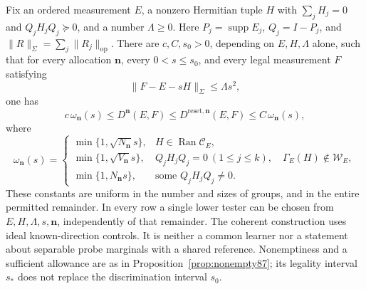 \begin{theorem}\label{thm:allocation89}
Fix an ordered measurement $E$, a nonzero Hermitian tuple $H$ with
$\sum_jH_j=0$ and $Q_jH_jQ_j\succeq0$, and a number $\Lambda\ge0$.
Here $P_j=\operatorname{supp}E_j$, $Q_j=I-P_j$, and
$\|R\|_\Sigma=\sum_j\|R_j\|_{\mathrm{op}}$.
There are $c,C,s_0>0$, depending on $E,H,\Lambda$ alone, such that
for every allocation $\boldsymbol n$, every $0<s\le s_0$, and every
legal measurement $F$ satisfying
\begin{equation}\label{eq:allocationtube89}
 \|F-E-sH\|_\Sigma\le\Lambda s^2,
\end{equation}
one has
\begin{equation}\label{eq:allocationlaw89}
 c\,\omega_{\boldsymbol n}(s)
 \le D^{\boldsymbol n}(E,F)
 \le D^{\mathrm{reset},\boldsymbol n}(E,F)\le C\,\omega_{\boldsymbol n}(s),
\end{equation}
where
\[
 \omega_{\boldsymbol n}(s)=
 \begin{cases}
 \min\{1,\sqrt{N_{\boldsymbol n}}s\},
                    &H\in\operatorname{Ran}\mathcal C_E,\\
 \min\{1,\sqrt{V_{\boldsymbol n}}s\},
                    &Q_jH_jQ_j=0\ (1\le j\le k),\quad
                           \Gamma_E(H)\notin\mathcal W_E,\\
 \min\{1,N_{\boldsymbol n}s\},&\text{some }Q_jH_jQ_j\ne0.
 \end{cases}
\]
These constants are uniform in the number and sizes of groups, and
in the entire permitted remainder.  In every row a single lower
tester can be chosen from $E,H,\Lambda,s,\boldsymbol n$, independently
of that remainder.  The coherent construction uses ideal
known-direction controls.  It is neither a common learner nor a
statement about separable probe marginals with a shared reference.
Nonemptiness and a sufficient allowance are as in
Proposition~\ref{prop:nonempty87}; its legality interval $s_*$ does
not replace the discrimination interval $s_0$.
\end{theorem}

